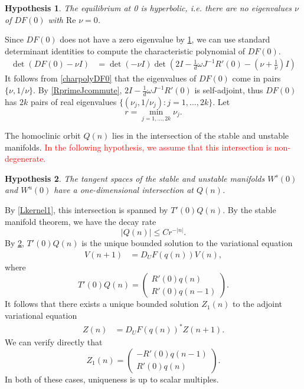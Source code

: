 \documentclass[12pt]{elsarticle}
\newtheorem{hypothesis}{Hypothesis}
\newcommand{\revised}[1]{ \textcolor{red}{#1} }
\begin{document}
\begin{hypothesis}\label{hyperbolichyp}
The equilibrium at 0 is hyperbolic, i.e. there are no eigenvalues $\nu$ of $DF(0)$ with $\text{Re } \nu = 0$. 
\end{hypothesis}
Since $DF(0)$ does not have a zero eigenvalue by \cref{hyperbolichyp}, we can use standard determinant identities to compute the characteristic polynomial of $DF(0)$.
\begin{align}\label{charpolyDF0}
\det(DF(0) - \nu I) &= 
\det(-\nu I) \det \left( 2I - \frac{1}{d}\omega J^{-1} R'(0) - \left( \nu + \frac{1}{\nu} \right) I\right)
\end{align}
It follows from \eqref{charpolyDF0} that the eigenvalues of $DF(0)$ come in pairs $\{\nu, 1/\nu\}$. By \eqref{RprimeJcommute}, $2I - \frac{1}{d}\omega J^{-1} R'(0)$ is self-adjoint, thus $DF(0)$ has $2k$ pairs of real eigenvalues $\{ (\nu_j, 1/\nu_j) : j = 1, \dots, 2k\}$. Let
\begin{equation}\label{defr}
r = \min_{j = 1, \dots, 2k} \nu_j.
\end{equation}

The homoclinic orbit $Q(n)$ lies in the intersection of the stable and unstable manifolds. \revised{In the following hypothesis, we assume that this intersection is non-degenerate.}

\begin{hypothesis}\label{intersectionhyp}
The tangent spaces of the stable and unstable manifolds $W^s(0)$ and $W^u(0)$ have a one-dimensional intersection at $Q(n)$.
\end{hypothesis}

\noindent By \cref{Lkernel1}, this intersection is spanned by $T'(0)Q(n)$. By the stable manifold theorem, we have the decay rate
\begin{equation}\label{Qdecay}
|Q(n)| \leq C r^{-|n|}.
\end{equation}
By \cref{intersectionhyp}, $T'(0) Q(n)$ is the unique bounded solution to the variational equation
\begin{align*}
V(n+1) &= D_U F(q(n)) V(n),
\end{align*}
where
\begin{equation}\label{varsol}
T'(0) Q(n) = \begin{pmatrix} R'(0) q(n) \\ R'(0) q(n-1) \end{pmatrix}.
\end{equation}
It follows that there exists a unique bounded solution $Z_1(n)$ to the adjoint variational equation
\begin{align*}
Z(n) &= D_U F(q(n))^* Z(n+1).
\end{align*}
We can verify directly that
\begin{equation}\label{adjvarsol}
Z_1(n) = \begin{pmatrix} -R'(0) q(n-1) \\ R'(0) q(n) \end{pmatrix}.
\end{equation}
In both of these cases, uniqueness is up to scalar multiples.
\end{document}
